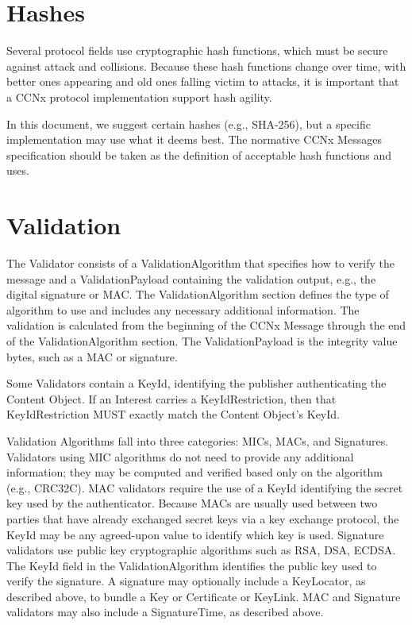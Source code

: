 \documentclass[12pt]{article}
\begin{document}
\section{Hashes}
Several protocol fields use cryptographic hash functions, which must
be secure against attack and collisions.  Because these hash
functions change over time, with better ones appearing and old ones
falling victim to attacks, it is important that a CCNx protocol
implementation support hash agility.

In this document, we suggest certain hashes (e.g., SHA-256), but a
specific implementation may use what it deems best.  The normative
CCNx Messages \cite{messages} specification should be taken as the
definition of acceptable hash functions and uses.

\section{Validation}
The Validator consists of a ValidationAlgorithm that specifies how to
verify the message and a ValidationPayload containing the validation
output, e.g., the digital signature or MAC.  The ValidationAlgorithm
section defines the type of algorithm to use and includes any
necessary additional information.  The validation is calculated from
the beginning of the CCNx Message through the end of the
ValidationAlgorithm section.  The ValidationPayload is the integrity
value bytes, such as a MAC or signature.

Some Validators contain a KeyId, identifying the publisher
authenticating the Content Object.  If an Interest carries a
KeyIdRestriction, then that KeyIdRestriction MUST exactly match the
Content Object's KeyId.

Validation Algorithms fall into three categories: MICs, MACs, and
Signatures.  Validators using MIC algorithms do not need to provide
any additional information; they may be computed and verified based
only on the algorithm (e.g., CRC32C).  MAC validators require the use
of a KeyId identifying the secret key used by the authenticator.
Because MACs are usually used between two parties that have already
exchanged secret keys via a key exchange protocol, the KeyId may be
any agreed-upon value to identify which key is used.  Signature
validators use public key cryptographic algorithms such as RSA, DSA,
ECDSA.  The KeyId field in the ValidationAlgorithm identifies the
public key used to verify the signature.  A signature may optionally
include a KeyLocator, as described above, to bundle a Key or
Certificate or KeyLink.  MAC and Signature validators may also
include a SignatureTime, as described above.
\end{document}
